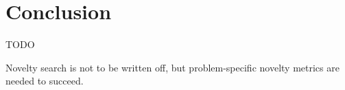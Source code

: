 \chapter{Conclusion}
TODO

Novelty search is not to be written off, but problem-specific novelty metrics are needed to succeed.
